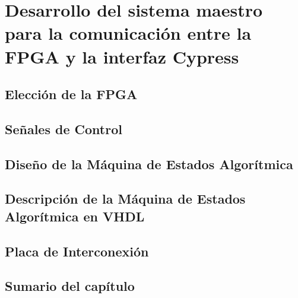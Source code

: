 \chapter{Desarrollo del sistema maestro para la comunicación entre la FPGA y la interfaz Cypress}
	\label{cap:fpga}
	
%		
	\section{Elección de la FPGA}
		\label{mats:fpga}
		
	\section{Señales de Control}
		
	\section{Diseño de la Máquina de Estados Algorítmica}
		
	\section{Descripción de la Máquina de Estados Algorítmica en VHDL}
		
	\section{Placa de Interconexión}
		
	\section{Sumario del capítulo}
		
